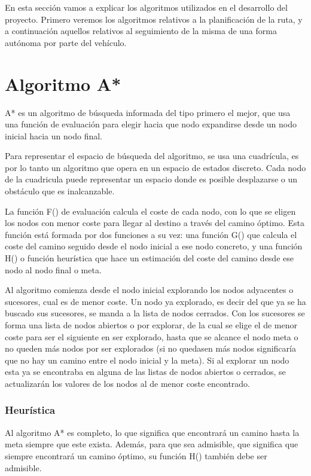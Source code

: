 
En esta sección vamos a explicar los algoritmos utilizados en el desarrollo del proyecto. Primero veremos los algoritmos relativos a la planificación de la ruta, y a continuación aquellos relativos al seguimiento de la misma de una forma autónoma por parte del vehículo.

\section{Algoritmo A*}

A* es un algoritmo de búsqueda informada del tipo primero el mejor, que usa una función de evaluación para elegir hacia que nodo expandirse desde un nodo inicial hacia un nodo final.

Para representar el espacio de búsqueda del algoritmo, se usa una cuadrícula, es por lo tanto un algoritmo que opera en un espacio de estados discreto. Cada nodo de la cuadricula puede representar un espacio donde es posible desplazarse o un obstáculo que es inalcanzable.

La función F() de evaluación calcula el coste de cada nodo, con lo que se eligen los nodos con menor coste para llegar al destino a través del camino óptimo. Esta función está formada por dos funciones a su vez: una función G() que calcula el coste del camino seguido desde el nodo inicial a ese nodo concreto, y una función H() o función heurística que hace un estimación del coste del camino desde ese nodo al nodo final o meta.

Al algoritmo comienza desde el nodo inicial explorando los nodos adyacentes o sucesores, cual es de menor coste. Un nodo ya explorado, es decir del que ya se ha buscado sus sucesores, se manda a la lista de nodos cerrados. Con los sucesores se forma una lista de nodos abiertos o por explorar, de la cual se elige el de menor coste para ser el siguiente en ser explorado, hasta que se alcance el nodo meta o no queden más nodos por ser explorados (si no quedasen más nodos significaría que no hay un camino entre el nodo inicial y la meta). Si al explorar un nodo esta ya se encontraba en alguna de las listas de nodos abiertos o cerrados, se actualizarán los valores de los nodos al de menor coste encontrado.

\subsubsection{Heurística}
Al algoritmo A* es completo, lo que significa que encontrará un camino hasta la meta siempre que este exista. Además, para que sea admisible, que significa que siempre encontrará un camino óptimo, su función H() también debe ser admisible.

